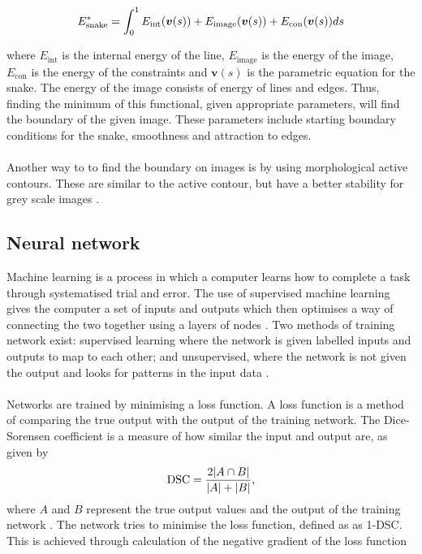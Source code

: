 \documentclass[12pt]{article}
\begin{document}
\begin{equation}
    \centering
    {E^*_{\mathrm{snake}}}= \int^1_0E_{\mathrm{int}}(\boldsymbol{v}(s))+ E_{\mathrm{image}}(\boldsymbol{v}(s))+E_{\mathrm{con}}(\boldsymbol{v}(s)) ds
\end{equation}

where $E_{\mathrm{int}}$ is the internal energy of the line, $E_{\mathrm{image}}$ is the energy of the image, $E_{\mathrm{con}}$ is the energy of the constraints and $\boldsymbol{v}(s)$ is the parametric equation for the snake. The energy of the image consists of energy of lines and edges. Thus, finding the minimum of this functional, given appropriate parameters, will find the boundary of the given image. These parameters include starting boundary conditions for the snake, smoothness and attraction to edges. 
\\ \\
Another way to to find the boundary on images is by using morphological active contours. These are similar to the active contour, but have a better stability for grey scale images \cite{Marquez-Neila:2014aa}.

\subsection{Neural network}
\color{black}
Machine learning is a process in which a computer learns how to complete a task through systematised trial and error. The use of supervised machine learning gives the computer a set of inputs and outputs which then optimises a way of connecting the two together using a layers of nodes \cite{Sabharwal:2011aa}. Two methods of training network exist: supervised learning where the network is given labelled inputs and outputs to map to each other; and unsupervised, where the network is not given the output and looks for patterns in the input data \cite{Chollet:2018aa}.
\\ \\
Networks are trained by minimising a loss function. A loss function is a method of comparing the true output with the output of the training network. The Dice-Sorensen coefficient is a measure of how similar the input and output are, as given by
\begin{equation}
\centering
\mathrm{DSC}={\frac{2\vert{A\cap B}\vert{}}{\vert{A}\vert{}+\vert{B}\vert{}}},
\end{equation}
where $A$ and $B$ represent the true output values and the output of the training network \cite{Dice:1945aa}. The network tries to minimise the loss function, defined as as \hbox{1-DSC}. This is achieved through calculation of the negative gradient of the loss function 
\end{document}
